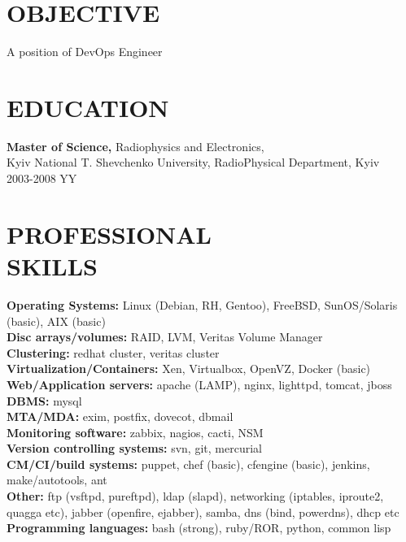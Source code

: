 \documentclass[mymargin,10pt]{res} %
\begin{document}
\begin{resume}

 
\section{OBJECTIVE}  

A position of DevOps Engineer


\section{EDUCATION}

{\bf Master of Science,} Radiophysics and Electronics, \\
Kyiv National T. Shevchenko University, RadioPhysical Department, Kyiv \\
2003-2008 YY
 

\section{PROFESSIONAL \\ SKILLS} 

{\bf Operating Systems:} Linux (Debian, RH, Gentoo), FreeBSD, SunOS/Solaris (basic), AIX (basic) \\
{\bf Disc arrays/volumes:} RAID, LVM, Veritas Volume Manager \\
{\bf Clustering:} redhat cluster, veritas cluster \\
{\bf Virtualization/Containers:} Xen, Virtualbox, OpenVZ, Docker (basic) \\
{\bf Web/Application servers:} apache (LAMP), nginx, lighttpd, tomcat, jboss \\
{\bf DBMS:} mysql \\
{\bf MTA/MDA:} exim, postfix, dovecot, dbmail \\
{\bf Monitoring software:}  zabbix, nagios, cacti, NSM \\
{\bf Version controlling systems:} svn, git, mercurial \\
{\bf CM/CI/build systems:} puppet, chef (basic), cfengine (basic), jenkins, make/autotools, ant \\
{\bf Other:} ftp (vsftpd, pureftpd), ldap (slapd), networking (iptables, iproute2, quagga etc), jabber
(openfire, ejabber), samba, dns (bind, powerdns), dhcp etc \\
{\bf Programming languages:} bash (strong), ruby/ROR, python, common lisp \\
 

\end{resume}
\end{document}
